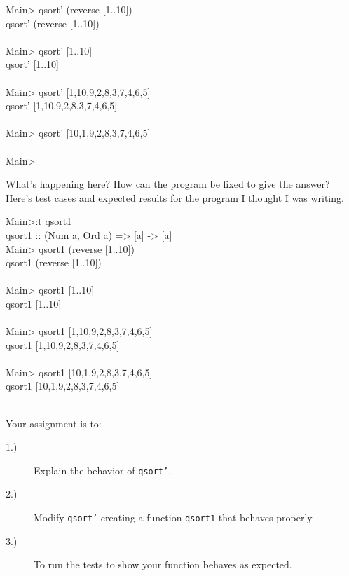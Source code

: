 \documentclass[11pt]{article}
\begin{document}
\begin{program*}
\> Main> qsort' (reverse [1..10]) \\
\> qsort' (reverse [1..10]) \\
\> [10,10,10,10,10,10,10,10,10,10] \\
\> Main> qsort' [1..10] \\
\> qsort' [1..10] \\
\> [1,3,5,7,9,11,13,15,17,19] \\
\> Main> qsort' [1,10,9,2,8,3,7,4,6,5] \\
\> qsort' [1,10,9,2,8,3,7,4,6,5] \\
\> [1,5,8,11,14,14,13,12,11,11] \\
\> Main> qsort' [10,1,9,2,8,3,7,4,6,5] \\
\> [2,5,8,11,14,14,13,12,11,10] \\
Main> 
\end{program*}

What's happening here?  How can the program be fixed to give the answer?
Here's test cases and expected results for the program I thought I was writing.

\begin{program*}
\> Main>:t qsort1 \\
\> qsort1 :: (Num a, Ord a) => [a] -> [a] \\
\> Main> qsort1 (reverse [1..10]) \\
\> qsort1 (reverse [1..10]) \\
\> [2,3,4,5,6,7,8,9,10,11] \\
\> Main> qsort1 [1..10] \\
\> qsort1 [1..10] \\
\> [2,3,4,5,6,7,8,9,10,11] \\
\> Main> qsort1 [1,10,9,2,8,3,7,4,6,5] \\
\> qsort1 [1,10,9,2,8,3,7,4,6,5] \\
\> [2,3,4,5,6,7,8,9,10,11] \\
\> Main> qsort1 [10,1,9,2,8,3,7,4,6,5] \\
\> qsort1 [10,1,9,2,8,3,7,4,6,5] \\
\> [2,3,4,5,6,7,8,9,10,11] \\
\end{program*}

\noindent{}Your assignment is to:
\begin{description}
\item[1.)] Explain the behavior of {\tt{qsort'}}.
\item[2.)] Modify {\tt{qsort'}} creating a function {\tt{qsort1}} that
behaves properly.
\item[3.)] To run the tests to show your function behaves as expected.
\end{description}
\end{document}
